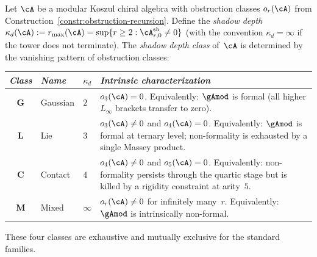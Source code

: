 \begin{definition}
\label{def:shadow-depth-classification}
\ClaimStatusProvedHere
{}
Let $\cA$ be a modular Koszul chiral algebra with
obstruction classes $o_r(\cA)$ from
Construction~\ref{constr:obstruction-recursion}.
Define the \emph{shadow depth}
$\kappa_d(\cA) := r_{\max}(\cA) =
\sup\{r \geq 2 : \cA^{\mathrm{sh}}_{r,0} \neq 0\}$
(with the convention $\kappa_d = \infty$ if the tower
does not terminate).
The \emph{shadow depth class} of~$\cA$ is determined
by the vanishing pattern of obstruction classes:
\begin{center}
\small
\renewcommand{\arraystretch}{1.15}
\begin{tabular}{clll}
\toprule
\emph{Class} & \emph{Name} & $\kappa_d$ &
\emph{Intrinsic characterization} \\
\midrule
$\mathbf{G}$ & Gaussian &
  $2$ &
  \begin{minipage}[t]{0.42\textwidth}\raggedright
  $o_3(\cA) = 0$.  Equivalently: $\gAmod$ is formal
  (all higher $L_\infty$ brackets transfer to zero).
  \end{minipage} \\[6pt]
$\mathbf{L}$ & Lie &
  $3$ &
  \begin{minipage}[t]{0.42\textwidth}\raggedright
  $o_3(\cA) \neq 0$ and $o_4(\cA) = 0$.  Equivalently:
  $\gAmod$ is formal at ternary level; non-formality
  is exhausted by a single Massey product.
  \end{minipage} \\[6pt]
$\mathbf{C}$ & Contact &
  $4$ &
  \begin{minipage}[t]{0.42\textwidth}\raggedright
  $o_4(\cA) \neq 0$ and $o_5(\cA) = 0$.  Equivalently:
  non-formality persists through the quartic stage
  but is killed by a rigidity constraint at arity~$5$.
  \end{minipage} \\[6pt]
$\mathbf{M}$ & Mixed &
  $\infty$ &
  \begin{minipage}[t]{0.42\textwidth}\raggedright
  $o_r(\cA) \neq 0$ for infinitely many~$r$.
  Equivalently: $\gAmod$ is intrinsically non-formal.
  \end{minipage} \\
\bottomrule
\end{tabular}
\end{center}
These four classes are exhaustive and mutually exclusive
for the standard families.
\end{definition}

